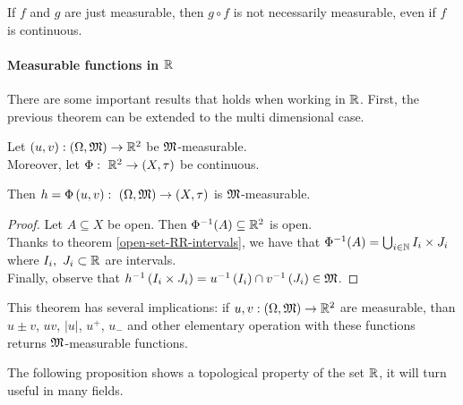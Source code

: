 If $f$ and $g$ are just measurable, then $g \circ f$ is not necessarily measurable, even if $f$ is continuous.

\paragraph{Measurable functions in $\mathbb R$}There are some important results that holds when working in $\mathbb R$. First, the previous theorem can be extended to the multi dimensional case.
\begin{theo}\label{multiple-measurable-function-composed-contiunuous} 
	Let $\left(u,v\right) : \left(\Omega,\mathfrak M\right)\to\mathbb R^2$ be $\mathfrak M$-measurable. \\
	Moreover, let $\Phi : \ \mathbb R^2 \to \left(X,\tau \right)$ be continuous.
	
	Then $h=\Phi\left(u,v\right):\ \left(\Omega,\mm\right)\to \left(X,\tau\right)$ is $\mathfrak M$-measurable.
\end{theo}
\begin{proof}
	Let $A \subseteq X$ be open. Then $\Phi^{-1}(A)\subseteq \mathbb R^2$ is open. \\
	Thanks to theorem \vref{open-set-RR-intervals}, we have that $\Phi^{-1}(A) = \bigcup_{i \in \mathbb N} I_{i}\times J_{i}$ where $I_{i},\ J_{i} \subset \mathbb R$ are intervals. \\
	Finally, observe that $h^{-1}\left(I_{i}\times J_{i}\right)=u^{-1}\left(I_{i}\right)\cap v^{-1}\left(J_{i}\right) \in \mathfrak M$.
\end{proof} 
This theorem has several implications: if $u,v:\left(\Omega,\mathfrak M\right)\to\mathbb R^2$ are measurable, than $u\pm v$, $uv$, $|u|$, $u^+$, $u_-$ and other elementary operation with these functions returns $\mathfrak M$-measurable functions.

The following proposition shows a topological property of the set $\mathbb R$, it will turn useful in many fields.

